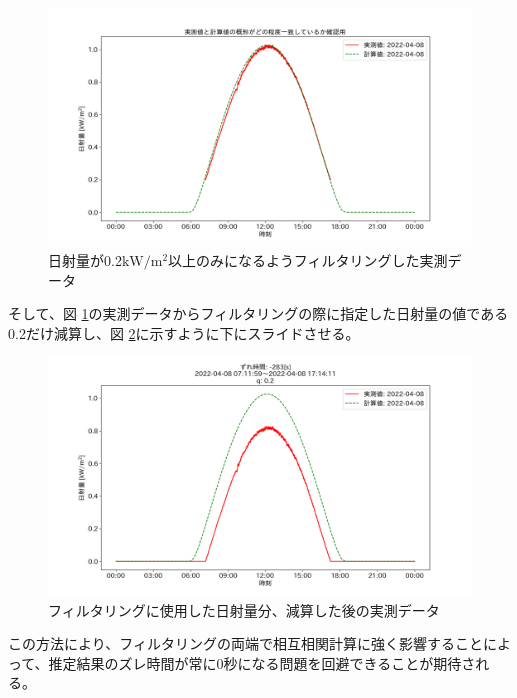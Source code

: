 \documentclass[a4j,12pt,]{jarticle}
\begin{document}
\begin{figure}[H]
  \begin{center}
    \includegraphics[width=160mm]{2022-04-08_mask_by_q_plot.png}
    \caption{日射量が0.2$\mathrm{kW}/\mathrm{m}^2$以上のみになるようフィルタリングした実測データ}
    \label{p9}
  \end{center}
\end{figure}

そして、図 \ref{p9}の実測データからフィルタリングの際に指定した日射量の値である0.2だけ減算し、図 \ref{p10}に示すように下にスライドさせる。

\begin{figure}[H]
  \begin{center}
    \includegraphics[width=160mm]{2022-04-08_mask_by_q_corr.png}
    \caption{フィルタリングに使用した日射量分、減算した後の実測データ}
    \label{p10}
  \end{center}
\end{figure}

この方法により、フィルタリングの両端で相互相関計算に強く影響することによって、推定結果のズレ時間が常に0秒になる問題を回避できることが期待される。
\end{document}
